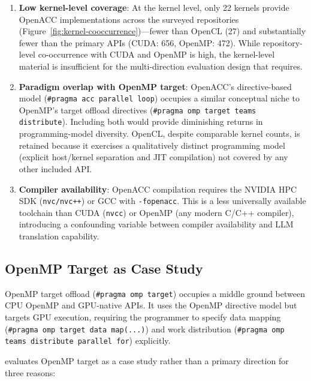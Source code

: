 \begin{enumerate}
    \item \textbf{Low kernel-level coverage}: At the kernel level, only 22 kernels provide OpenACC implementations across the surveyed repositories (Figure~\ref{fig:kernel-cooccurrence})---fewer than OpenCL (27) and substantially fewer than the primary APIs (CUDA: 656, OpenMP: 472). While repository-level co-occurrence with CUDA and OpenMP is high, the kernel-level material is insufficient for the multi-direction evaluation design that \parbench{} requires.
    
    \item \textbf{Paradigm overlap with OpenMP target}: OpenACC's directive-based model (\texttt{\#pragma acc parallel loop}) occupies a similar conceptual niche to OpenMP's target offload directives (\texttt{\#pragma omp target teams distribute}). Including both would provide diminishing returns in programming-model diversity. OpenCL, despite comparable kernel counts, is retained because it exercises a qualitatively distinct programming model (explicit host/kernel separation and JIT compilation) not covered by any other included API.
    
    \item \textbf{Compiler availability}: OpenACC compilation requires the NVIDIA HPC SDK (\texttt{nvc/nvc++}) or GCC with \texttt{-fopenacc}. This is a less universally available toolchain than CUDA (\texttt{nvcc}) or OpenMP (any modern C/C++ compiler), introducing a confounding variable between compiler availability and LLM translation capability.
\end{enumerate}

\subsection{OpenMP Target as Case Study}
\label{sec:appendix-b5}

OpenMP target offload (\texttt{\#pragma omp target}) occupies a middle ground between CPU OpenMP and GPU-native APIs. It uses the OpenMP directive model but targets GPU execution, requiring the programmer to specify data mapping (\texttt{\#pragma omp target data map(...)}) and work distribution (\texttt{\#pragma omp teams distribute parallel for}) explicitly.

\parbench{} evaluates OpenMP target as a case study rather than a primary direction
for three reasons:

